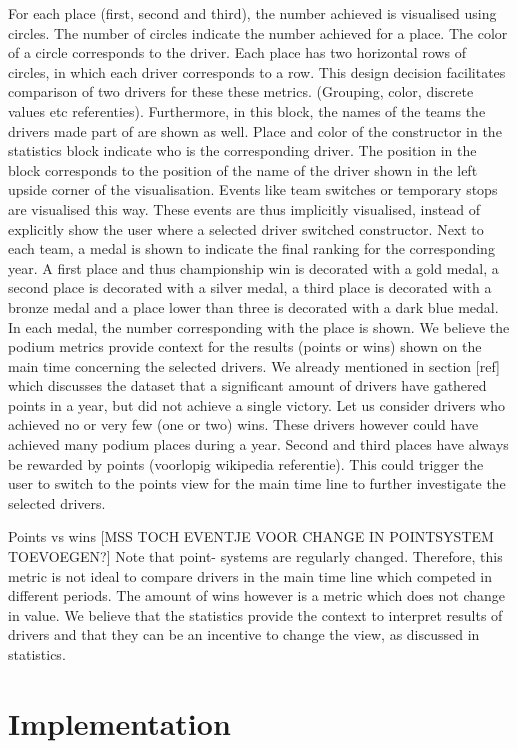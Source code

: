 \documentclass{sigchi}
\begin{document}
For each place (first, second and third), the number achieved is visualised using circles. The number of circles indicate the number achieved for a place. The color of a circle corresponds to the driver. Each place has two horizontal rows of circles, in which each driver corresponds to a row. This design decision facilitates comparison of two drivers for these these metrics. (Grouping, color, discrete values etc referenties). Furthermore, in this block, the names of the teams the drivers made part of are shown as well. Place and color of the constructor in the statistics block indicate who is the corresponding driver. The position in the block corresponds to the position of the name of the driver shown in the left upside corner of the visualisation.  Events like team switches or temporary stops are visualised this way. These events are thus implicitly visualised, instead of explicitly show the user where a selected driver switched constructor. Next to each team, a medal is shown to indicate the final ranking for the corresponding year. A first place and thus championship win is decorated with a gold medal, a second place is decorated with a silver medal, a third place is decorated with a bronze medal and a place lower than three is decorated with a dark blue medal. In each medal, the number corresponding with the place is shown. We believe the podium metrics provide context for the results (points or wins) shown on the main time concerning the selected drivers. We already mentioned in section [ref] which discusses the dataset that a significant amount of drivers have gathered points in a year, but did not achieve a single victory. Let us consider drivers who achieved no or very few (one or two) wins. These drivers however could have achieved many podium places during a year. Second and third places have always be rewarded by points (voorlopig wikipedia referentie). This could trigger the user to switch to the points view for the main time line to further investigate the selected drivers.

Points vs wins [MSS TOCH EVENTJE VOOR CHANGE IN POINTSYSTEM TOEVOEGEN?]
Note that point- systems are regularly changed. Therefore, this metric is not ideal to compare drivers in the main time line which competed in different periods. The amount of wins however is a metric which does not change in value. We believe that the statistics provide the context to interpret results of drivers and that they can be an incentive to change the view, as discussed in statistics. 

\section{Implementation} %
\label{sec:implementation}
\end{document}
